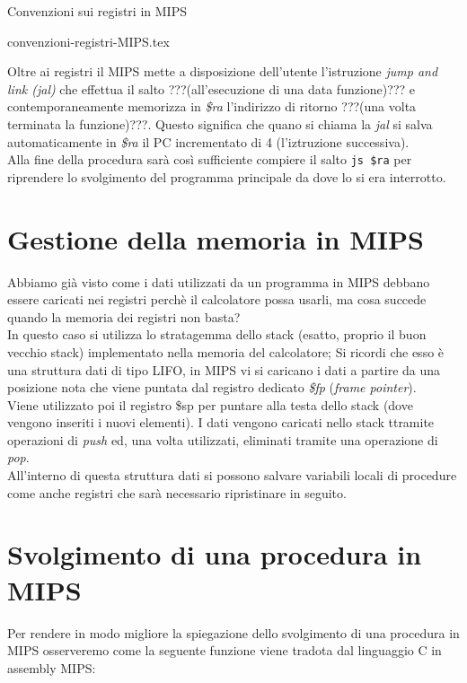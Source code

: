 \documentclass[class=book, crop=false]{standalone}
\begin{document}
\begin{table}[H]
	\centering
	\caption{Convenzioni sui registri in MIPS}
	{convenzioni-registri-MIPS.tex}
\end{table}

Oltre ai registri il MIPS mette a disposizione dell'utente l'istruzione \emph{jump and link (jal)} che effettua il salto ???(all'esecuzione di una data funzione)??? e contemporaneamente memorizza in \emph{\$ra} l'indirizzo di ritorno ???(una volta terminata la funzione)???. Questo significa che quano si chiama la \emph{jal} si salva automaticamente in \emph{\$ra} il PC incrementato di 4 (l'iztruzione successiva).\\
Alla fine della procedura sarà così sufficiente compiere il salto \texttt{js \$ra} per riprendere lo svolgimento del programma principale da dove lo si era interrotto.

\section{Gestione della memoria in MIPS}
Abbiamo già visto come i dati utilizzati da un programma in MIPS debbano essere caricati nei registri perchè il calcolatore possa usarli, ma cosa succede quando la memoria dei registri non basta?\\
In questo caso si utilizza lo stratagemma dello stack (esatto, proprio il buon vecchio stack) implementato nella memoria del calcolatore; Si ricordi che esso è una struttura dati di tipo LIFO, in MIPS vi si caricano i dati a partire da una posizione nota che viene puntata dal registro dedicato \emph{\$fp} (\emph{frame pointer}).\\
Viene utilizzato poi il registro \$sp per puntare alla testa dello stack (dove vengono inseriti i nuovi elementi).
I dati vengono caricati nello stack ttramite operazioni di \emph{push} ed, una volta utilizzati, eliminati tramite una operazione di \emph{pop}.\\
All'interno di questa struttura dati si possono salvare variabili locali di procedure come anche registri che sarà necessario ripristinare in seguito.\\

\section{Svolgimento di una procedura in MIPS}
Per rendere in modo migliore la spiegazione dello svolgimento di una procedura in MIPS osserveremo come la seguente funzione viene tradota dal linguaggio C in assembly MIPS:
\end{document}
